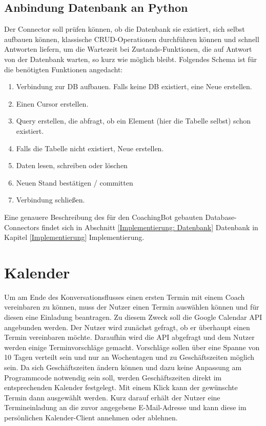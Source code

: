         \subsection{Anbindung Datenbank an Python} \label{Realisierung: data base connector}
            Der Connector soll prüfen können, ob die Datenbank sie existiert, sich selbst aufbauen können, klassische CRUD-Operationen durchführen können und schnell Antworten liefern, um die Wartezeit bei Zustands-Funktionen, die auf Antwort von der Datenbank warten, so kurz wie möglich bleibt. Folgendes Schema ist für die benötigten Funktionen angedacht:
            \begin{enumerate}
                \item Verbindung zur DB aufbauen. Falls keine DB existiert, eine Neue erstellen.
                \item Einen Cursor erstellen.
                \item Query erstellen, die abfragt, ob ein Element (hier die Tabelle selbst) schon existiert.
                \item Falls die Tabelle nicht existiert, Neue erstellen.
                \item Daten lesen, schreiben oder löschen
                \item Neuen Stand bestätigen / committen
                \item Verbindung schließen.
            \end{enumerate}

            Eine genauere Beschreibung des für den CoachingBot gebauten Database-Connectors findet sich in Abschnitt \ref*{Implementierung: Datenbank} Datenbank in Kapitel \ref*{Implementierung} Implementierung.


    \section{Kalender} \label{Realisierung: calendar}
        Um am Ende des Konversationsflusses einen ersten Termin mit einem Coach vereinbaren zu können, muss der Nutzer einen Termin auswählen können und für diesen eine Einladung beantragen. Zu diesem Zweck soll die Google Calendar API angebunden werden. Der Nutzer wird zunächst gefragt, ob er überhaupt einen Termin vereinbaren möchte. Daraufhin wird die API abgefragt und dem Nutzer werden einige Terminvorschläge gemacht. Vorschläge sollen über eine Spanne von 10 Tagen verteilt sein und nur an Wochentagen und zu Geschäftszeiten möglich sein. Da sich Geschäftszeiten ändern können und dazu keine Anpassung am Programmcode notwendig sein soll, werden Geschäftszeiten direkt im entsprechenden Kalender festgelegt. Mit einem Klick kann der gewünschte Termin dann ausgewählt werden. Kurz darauf erhält der Nutzer eine Termineinladung an die zuvor angegebene E-Mail-Adresse und kann diese im persönlichen Kalender-Client annehmen oder ablehnen. \\
        

